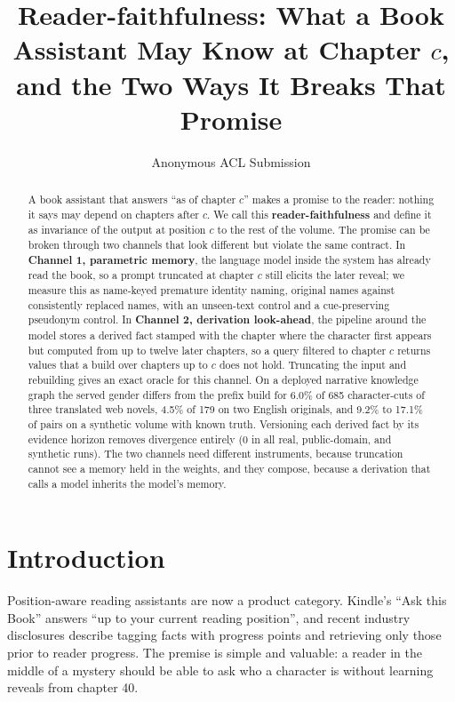 \documentclass[11pt]{article}
\title{Reader-faithfulness: What a Book Assistant May Know at Chapter $c$, and the Two Ways It Breaks That Promise}
\author{Anonymous ACL Submission}
\begin{document}
\maketitle

\begin{abstract}
A book assistant that answers ``as of chapter $c$'' makes a promise to the reader: nothing it says may depend on chapters after $c$. We call this \textbf{reader-faithfulness} and define it as invariance of the output at position $c$ to the rest of the volume. The promise can be broken through two channels that look different but violate the same contract. In \textbf{Channel 1, parametric memory}, the language model inside the system has already read the book, so a prompt truncated at chapter $c$ still elicits the later reveal; we measure this as name-keyed premature identity naming, original names against consistently replaced names, with an unseen-text control and a cue-preserving pseudonym control. In \textbf{Channel 2, derivation look-ahead}, the pipeline around the model stores a derived fact stamped with the chapter where the character first appears but computed from up to twelve later chapters, so a query filtered to chapter $c$ returns values that a build over chapters up to $c$ does not hold. Truncating the input and rebuilding gives an exact oracle for this channel. On a deployed narrative knowledge graph the served gender differs from the prefix build for 6.0\% of 685 character-cuts of three translated web novels, 4.5\% of 179 on two English originals, and 9.2\% to 17.1\% of pairs on a synthetic volume with known truth. Versioning each derived fact by its evidence horizon removes divergence entirely (0 in all real, public-domain, and synthetic runs). The two channels need different instruments, because truncation cannot see a memory held in the weights, and they compose, because a derivation that calls a model inherits the model's memory.
\end{abstract}

\section{Introduction}

Position-aware reading assistants are now a product category. Kindle's ``Ask this Book'' answers ``up to your current reading position'', and recent industry disclosures describe tagging facts with progress points and retrieving only those prior to reader progress. The premise is simple and valuable: a reader in the middle of a mystery should be able to ask who a character is without learning reveals from chapter 40.
\end{document}
